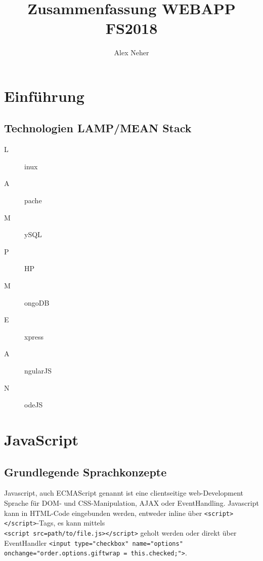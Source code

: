 \documentclass[a4paper, 11pt]{article}
\newcommand{\code}[1]{\texttt{#1}}
\begin{document}
	
\title{Zusammenfassung WEBAPP FS2018}
\author{Alex Neher}
\maketitle

\tableofcontents
\newpage

\graphicspath{{./Pictures/}}

\section{Einführung}
\subsection{Technologien LAMP/MEAN Stack}
\begin{minipage}{0.45\textwidth}
	\begin{description}
		\item[L] inux
		\item[A] pache
		\item[M] ySQL
		\item[P] HP
	\end{description}
\end{minipage} \hfil
\begin{minipage}{0.45\textwidth}
	
	\begin{description}
		\item[M] ongoDB
		\item[E] xpress
		\item[A] ngularJS
		\item[N] odeJS
	\end{description}

\end{minipage}

\section{JavaScript}
\subsection{Grundlegende Sprachkonzepte}
Javascript, auch ECMAScript genannt ist eine clientseitige web-Development Sprache für DOM- und CSS-Manipulation, AJAX oder EventHandling. Javascript kann in HTML-Code eingebunden werden, entweder inline über \code{<script></script>}-Tags, es kann mittels \\
\code{<script src=path/to/file.js></script>} geholt werden oder direkt über EventHandler \code{<input type="checkbox" name="options" onchange="order.options.giftwrap = this.checked;">}. 
\end{document}
